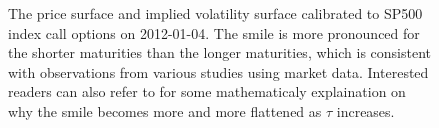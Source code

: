 \begin{figure}[htp!]
	\centering
	\caption{The price surface and implied volatility surface calibrated to SP500 index call options on 2012-01-04. The smile is more pronounced for the shorter maturities than the longer maturities, which is consistent with observations from various studies \cite{chance2017bias,rogers2010can} using market data. Interested readers can also refer to \cite{rogers2010can} for some mathematicaly explaination on why the smile becomes more and more flattened as $\tau$ increases.}
	\label{fig:CaliExp}
\end{figure}


